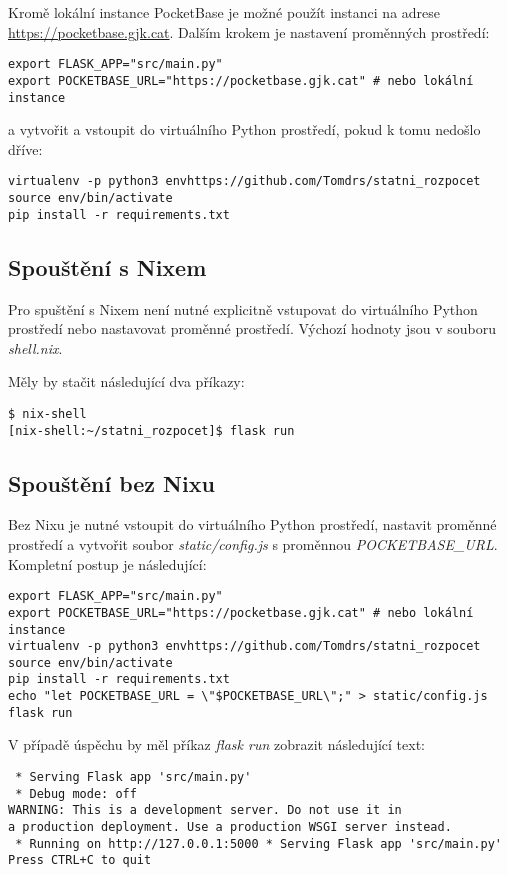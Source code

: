 \documentclass[11pt,a4paper,twoside,openright]{report}
\begin{document}
Kromě lokální instance PocketBase je možné použít instanci na adrese \url{https://pocketbase.gjk.cat}.
Dalším krokem je nastavení proměnných prostředí:

\begin{verbatim}
export FLASK_APP="src/main.py"
export POCKETBASE_URL="https://pocketbase.gjk.cat" # nebo lokální instance
\end{verbatim}

a vytvořit a vstoupit do virtuálního Python prostředí, pokud k tomu nedošlo dříve:

\begin{verbatim}
virtualenv -p python3 envhttps://github.com/Tomdrs/statni_rozpocet
source env/bin/activate
pip install -r requirements.txt
\end{verbatim}

\subsection{Spouštění s Nixem}
Pro spuštění s Nixem není nutné explicitně vstupovat do virtuálního Python prostředí nebo nastavovat proměnné prostředí.
Výchozí hodnoty jsou v souboru \emph{shell.nix}.

Měly by stačit následující dva příkazy:
\begin{verbatim}
$ nix-shell
[nix-shell:~/statni_rozpocet]$ flask run
\end{verbatim}

\subsection{Spouštění bez Nixu}
Bez Nixu je nutné vstoupit do virtuálního Python prostředí, nastavit proměnné prostředí
a vytvořit soubor \emph{static/config.js} s proměnnou \emph{POCKETBASE\_URL}. Kompletní postup je následující:

\begin{verbatim}
export FLASK_APP="src/main.py"
export POCKETBASE_URL="https://pocketbase.gjk.cat" # nebo lokální instance
virtualenv -p python3 envhttps://github.com/Tomdrs/statni_rozpocet
source env/bin/activate
pip install -r requirements.txt
echo "let POCKETBASE_URL = \"$POCKETBASE_URL\";" > static/config.js
flask run
\end{verbatim}

V případě úspěchu by měl příkaz \emph{flask run} zobrazit následující text:

\begin{verbatim}
 * Serving Flask app 'src/main.py'
 * Debug mode: off
WARNING: This is a development server. Do not use it in
a production deployment. Use a production WSGI server instead.
 * Running on http://127.0.0.1:5000 * Serving Flask app 'src/main.py'
Press CTRL+C to quit
\end{verbatim}
\end{document}
